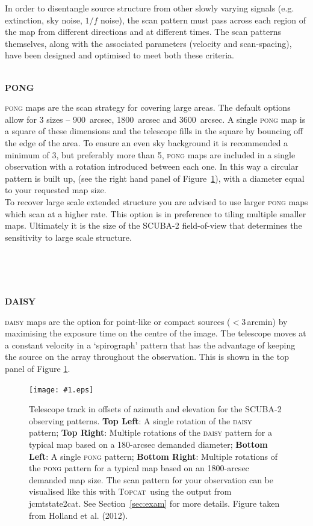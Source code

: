 \documentclass[twoside,11pt]{article}
\newcommand{\htmladdnormallink}[2]{#1}
\newcommand{\htmladdimg}[1]{}
\newcommand{\xref}[3]{#1}
\renewcommand{\_}{\texttt{\symbol{95}}}
\newcommand{\topcat}{\htmladdnormallink{\textsc{Topcat}}{http://www.starlink.ac.uk/topcat}}
\newcommand{\task}[1]{\textsf{#1}}
\newcommand{\jcmtstate}{\xref{\task{jcmtstate2cat}}{sun258}{JCMTSTATE2CAT}}
\newcommand{\myfig}[5]{
  \begin{figure}#2
    \centering\texttt{[image: \#1.eps]}
    \typeout{#1.eps inserted on page \arabic{page}}
    \caption{\label{#4}\small #5}
  \end{figure}
}
\newcommand{\myfig}[5]{
    \label{#4} \htmladdimg{#1.png}\\
    \\
    Figure: #5\\
  }
\begin{document}
In order to disentangle source structure from other
slowly varying signals (e.g. extinction, sky noise, $1/f$ noise), the
scan pattern must pass across each region of the map from different
directions and at different times. The scan patterns themselves, along
with the associated parameters (velocity and scan-spacing), have been
designed and optimised to meet both these criteria.
\\ \\
\begin{minipage}[t]{0.12\linewidth}
\textbf{PONG}
\end{minipage}
\begin{minipage}[t]{0.85\linewidth}\textsc{pong} maps are the scan
strategy for covering large areas. The default options allow for 3
sizes -- 900~arcsec, 1800~arcsec and 3600~arcsec. A single \textsc{pong} map is
a square of these dimensions and the telescope fills in the square by
bouncing off the edge of the area. To ensure an even sky background it
is recommended a minimum of 3, but preferably more than 5,
\textsc{pong} maps are included in a single observation with a
rotation introduced between each one. In this way a circular pattern
is built up, (see the right hand panel of Figure~\ref{fig:scan}), with
a diameter equal to your requested map size.
\vspace{0.2cm}\\
To recover large scale extended structure you are advised to use
larger \textsc{pong} maps which scan at a higher rate. This option is
in preference to tiling multiple smaller maps. Ultimately it is the
size of the SCUBA-2 field-of-view that determines the sensitivity to
large scale structure.
\end{minipage}
\\ \\ \\
\begin{minipage}[t]{0.12\linewidth}
\textbf{DAISY}
\end{minipage}
\begin{minipage}[t]{0.85\linewidth}
\textsc{daisy} maps are the option for point-like or compact sources
($<$3\,arcmin) by maximising the exposure time on the centre of the
image. The telescope moves at a constant velocity in a `spirograph'
pattern that has the advantage of keeping the source on the array
throughout the observation. This is shown in the top panel of Figure
\ref{fig:scan}.
\end{minipage}

\myfig{sc21_wayne_scan}{[b!]}{width=0.9\linewidth}{fig:scan}{
  Telescope track in offsets of azimuth and elevation for the SCUBA-2
  observing patterns. \textbf{Top Left}: A single rotation of the
  \textsc{daisy} pattern; \textbf{Top Right}: Multiple rotations of
  the \textsc{daisy} pattern for a typical map based on a 180-arcsec
  demanded diameter; \textbf{Bottom Left}: A single \textsc{pong}
  pattern; \textbf{Bottom Right}: Multiple rotations of the
  \textsc{pong} pattern for a typical map based on an 1800-arcsec
  demanded map size. The scan pattern for your observation can be
  visualised like this with \topcat\ using the output from \jcmtstate.
  See Section~\ref{sec:exam} for more details. Figure taken from
  Holland et al. (2012).}
\end{document}
